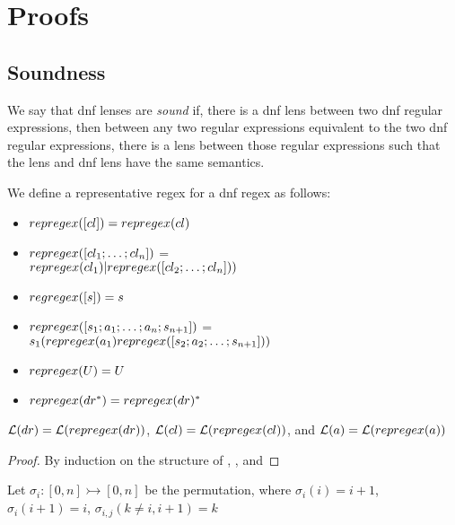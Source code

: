 \section{Proofs}

\subsection{Soundness}
We say that dnf lenses are \textit{sound} if, there is a dnf lens between two
dnf regular expressions, then between any two regular expressions equivalent
to the two dnf regular expressions, there is a lens between those regular
expressions such that the lens and dnf lens have the same semantics.

\begin{definition}[repregex]
We define a representative regex for a dnf regex as follows:
\begin{itemize}
\item $repregex([cl])=repregex(cl)$
\item $repregex([cl_1 ; \ldots ; cl_n])$ =\\ $repregex(cl_1)| repregex([cl_2 ; \ldots ; cl_n]))$
\item $regregex([s]) = s$
\item $repregex([s_1 ; a_1 ; \ldots ; a_n ; s_{n+1}])$ =\\ $s_1 (repregex(a_1) repregex([s_2 ; a_2 ; \ldots ; s_{n+1}]))$
\item $repregex(U) = U$
\item $repregex(dr^*) = repregex(dr)^*$
\end{itemize}
\end{definition}

\begin{lemma}
$\mathcal{L}(dr)=\mathcal{L}(repregex(dr))$,
$\mathcal{L}(cl) = \mathcal{L}(repregex(cl))$,
and $\mathcal{L}(a) = \mathcal{L}(repregex(a))$
\begin{proof}
By induction on the structure of \DNFRegex, \Clause, and \Atom
\end{proof}
\end{lemma}

\begin{definition}
Let $\sigma_{i} : [0,n] \rightarrowtail [0,n]$ be the permutation, where
$\sigma_{i}(i) = i+1$, $\sigma_{i}(i+1) = i$, $\sigma_{i,j}(k\neq i,i+1) = k$
\end{definition}

